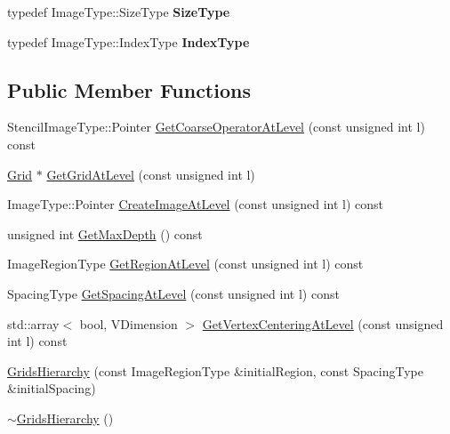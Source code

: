 \begin{DoxyCompactItemize}
\item 
\hypertarget{classitk_1_1mad_1_1_grids_hierarchy_a8ae9e2ae3fd0eb0bf300af1e2a158df9}{typedef Image\-Type\-::\-Size\-Type {\bfseries Size\-Type}}\label{classitk_1_1mad_1_1_grids_hierarchy_a8ae9e2ae3fd0eb0bf300af1e2a158df9}

\item 
\hypertarget{classitk_1_1mad_1_1_grids_hierarchy_a5fc892f212cd811c07302ffa89cfb93c}{typedef Image\-Type\-::\-Index\-Type {\bfseries Index\-Type}}\label{classitk_1_1mad_1_1_grids_hierarchy_a5fc892f212cd811c07302ffa89cfb93c}

\end{DoxyCompactItemize}
\subsection*{Public Member Functions}
\begin{DoxyCompactItemize}
\item 
Stencil\-Image\-Type\-::\-Pointer \hyperlink{classitk_1_1mad_1_1_grids_hierarchy_a1fabd3c99e3e7fd81f05f5ceddc35810}{Get\-Coarse\-Operator\-At\-Level} (const unsigned int l) const 
\item 
\hyperlink{structitk_1_1mad_1_1_grids_hierarchy_1_1_grid}{Grid} $\ast$ \hyperlink{classitk_1_1mad_1_1_grids_hierarchy_adbe73da5d41fd62a6aa05405e739633b}{Get\-Grid\-At\-Level} (const unsigned int l)
\item 
Image\-Type\-::\-Pointer \hyperlink{classitk_1_1mad_1_1_grids_hierarchy_a371729b077c35e3367f6ef3e4efc4865}{Create\-Image\-At\-Level} (const unsigned int l) const 
\item 
unsigned int \hyperlink{classitk_1_1mad_1_1_grids_hierarchy_aa1d52d9a52dfd38235f8c78890d457b0}{Get\-Max\-Depth} () const 
\item 
Image\-Region\-Type \hyperlink{classitk_1_1mad_1_1_grids_hierarchy_ab993ed3190b19b4554eb718240258dae}{Get\-Region\-At\-Level} (const unsigned int l) const 
\item 
Spacing\-Type \hyperlink{classitk_1_1mad_1_1_grids_hierarchy_a2c594f9e3a4888666cafa652443e6b2a}{Get\-Spacing\-At\-Level} (const unsigned int l) const 
\item 
std\-::array$<$ bool, V\-Dimension $>$ \hyperlink{classitk_1_1mad_1_1_grids_hierarchy_ac85c588f321ed335bcb282b13afbf05e}{Get\-Vertex\-Centering\-At\-Level} (const unsigned int l) const 
\item 
\hyperlink{classitk_1_1mad_1_1_grids_hierarchy_a7189f95878b8489a473b004d86252467}{Grids\-Hierarchy} (const Image\-Region\-Type \&initial\-Region, const Spacing\-Type \&initial\-Spacing)
\item 
\hyperlink{classitk_1_1mad_1_1_grids_hierarchy_a334910fb2af63d58e2c77774473c55d6}{$\sim$\-Grids\-Hierarchy} ()
\end{DoxyCompactItemize}


